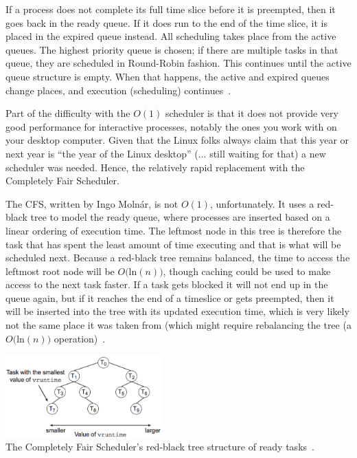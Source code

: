 If a process does not complete its full time slice before it is preempted, then it goes back in the ready queue. If it does run to the end of the time slice, it is placed in the expired queue instead. All scheduling takes place from the active queues. The highest priority queue is chosen; if there are multiple tasks in that queue, they are scheduled in Round-Robin fashion. This continues until the active queue structure is empty. When that happens, the active and expired queues change places, and execution (scheduling) continues~\cite{osi}.

Part of the difficulty with the $O(1)$ scheduler is that it does not provide very good performance for interactive processes, notably the ones you work with on your desktop computer. Given that the Linux folks always claim that this year or next year is ``the year of the Linux desktop'' (... still waiting for that) a new scheduler was needed. Hence, the relatively rapid replacement with the Completely Fair Scheduler.

The CFS, written by Ingo Moln\'ar, is not $O(1)$, unfortunately. It uses a red-black tree to model the ready queue, where processes are inserted based on a linear ordering of execution time. The leftmost node in this tree is therefore the task that has spent the least amount of time executing and that is what will be scheduled next. Because a red-black tree remains balanced, the time to access the leftmost root node will be $O($ln$(n))$, though caching could be used to make access to the next task faster. If a task gets blocked it will not end up in the queue again, but if it reaches the end of a timeslice or gets preempted, then it will be inserted into the tree with its updated execution time, which is very likely not the same place it was taken from (which might require rebalancing the tree (a $O($ln$(n))$ operation)~\cite{mte241}.

\begin{center}
	\includegraphics[width=0.45\textwidth]{images/cfs.png}\\
	The Completely Fair Scheduler's red-black tree structure of ready tasks~\cite{osc}.
\end{center}


